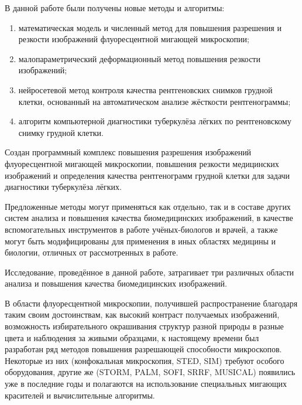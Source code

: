 {\novelty}

В данной работе были получены новые методы и алгоритмы:
\begin{enumerate}[beginpenalty=10000]
	\item математическая модель и численный метод для повышения разрешения и резкости изображений флуоресцентной мигающей микроскопии;
	
	\item малопараметрический деформационный метод повышения резкости изображений;
	
	\item нейросетевой метод контроля качества рентгеновских снимков грудной клетки, основанный на автоматическом анализе жёсткости рентгенограммы;
	
	\item алгоритм компьютерной диагностики туберкулёза лёгких по рентгеновскому снимку грудной клетки.
\end{enumerate}


{\influence}

Создан программный комплекс повышения разрешения изображений флуоресцентной мигающей микроскопии, повышения резкости медицинских изображений и определения качества рентгенограмм грудной клетки для задачи диагностики туберкулёза лёгких.

Предложенные методы могут применяться как отдельно, так и в составе других систем анализа и повышения качества биомедицинских изображений, в качестве вспомогательных инструментов в работе учёных-биологов и врачей, а также могут быть модифицированы для применения в иных областях медицины и биологии, отличных от рассмотренных в работе.


{\progress}

Исследование, проведённое в данной работе, затрагивает три различных области анализа и повышения качества биомедицинских изображений.

В области флуоресцентной микроскопии, получившей распространение благодаря таким своим достоинствам, как высокий контраст получаемых изображений, возможность избирательного окрашивания структур разной природы в разные цвета и наблюдения за живыми образцами, к настоящему времени был разработан ряд методов повышения разрешающей способности микроскопов. Некоторые из них (конфокальная микроскопия, STED, SIM) требуют особого оборудования, другие же (STORM, PALM, SOFI, SRRF, MUSICAL) появились уже в последние годы и полагаются на использование специальных мигающих красителей и вычислительные алгоритмы.

